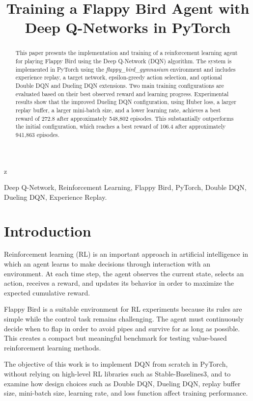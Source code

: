 \documentclass[conference]{IEEEtran}
\title{Training a Flappy Bird Agent with Deep Q-Networks in PyTorch}
\author{
\IEEEauthorblockN{Nguyen Vo Khang}
\IEEEauthorblockA{
Institution: \textit{Fill in your institution}\\
Email: \textit{Fill in your email}
}
}
\begin{document}
\maketitle
z
\begin{abstract}
This paper presents the implementation and training of a reinforcement learning agent for playing Flappy Bird using the Deep Q-Network (DQN) algorithm. The system is implemented in PyTorch using the \textit{flappy\_bird\_gymnasium} environment and includes experience replay, a target network, epsilon-greedy action selection, and optional Double DQN and Dueling DQN extensions. Two main training configurations are evaluated based on their best observed reward and learning progress. Experimental results show that the improved Dueling DQN configuration, using Huber loss, a larger replay buffer, a larger mini-batch size, and a lower learning rate, achieves a best reward of 272.8 after approximately 548,802 episodes. This substantially outperforms the initial configuration, which reaches a best reward of 106.4 after approximately 941,863 episodes.
\end{abstract}

\begin{IEEEkeywords}
Deep Q-Network, Reinforcement Learning, Flappy Bird, PyTorch, Double DQN, Dueling DQN, Experience Replay.
\end{IEEEkeywords}

\section{Introduction}
Reinforcement learning (RL) is an important approach in artificial intelligence in which an agent learns to make decisions through interaction with an environment. At each time step, the agent observes the current state, selects an action, receives a reward, and updates its behavior in order to maximize the expected cumulative reward.

Flappy Bird is a suitable environment for RL experiments because its rules are simple while the control task remains challenging. The agent must continuously decide when to flap in order to avoid pipes and survive for as long as possible. This creates a compact but meaningful benchmark for testing value-based reinforcement learning methods.

The objective of this work is to implement DQN from scratch in PyTorch, without relying on high-level RL libraries such as Stable-Baselines3, and to examine how design choices such as Double DQN, Dueling DQN, replay buffer size, mini-batch size, learning rate, and loss function affect training performance.
\end{document}
